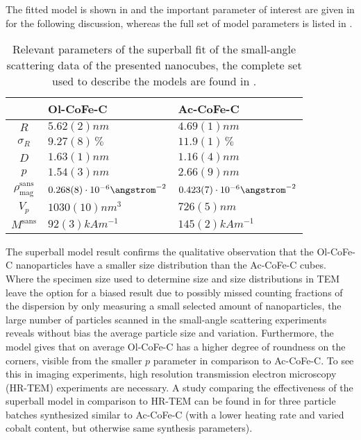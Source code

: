 The fitted model is shown in  and the important parameter of interest are given in  for the following discussion, whereas the full set of model parameters is listed in .
\begin{table}[ht]
  \centering
  \caption{\label{tab:monolayers:nanoparticle:sas}Relevant parameters of the superball fit of the small-angle scattering data of the presented nanocubes, the complete set used to describe the models are found in .}
  \begin{tabular}{ c | l | l }
      & Ol-CoFe-C & Ac-CoFe-C \\
    \hline
    $R$
      & $5.62(2) \unit{nm}$
      & $4.69(1) \unit{nm}$\\
    $\sigma_R$
      & $9.27(8) \,\%$
      & $11.9(1) \,\%$\\
    $D$
      & $1.63(1) \unit{nm}$
      & $1.16(4) \unit{nm}$\\
    $p$
      & $1.54(3) \unit{nm}$
      & $2.66(9) \unit{nm}$\\
    $\rho_\mathrm{mag}^\mathrm{sans}$
      & $0.268(8) \cdot 10^{-6} \angstrom^{-2}$
      & $0.423(7) \cdot 10^{-6} \angstrom^{-2}$\\
    \hline
    $V_p$
      & $1030(10) \unit{nm^3}$
      & $726(5) \unit{nm}$\\
    $M^\mathrm{sans}$
      & $92(3) \unit{kAm^{-1}}$
      & $145(2) \unit{kAm^{-1}}$\\
    \hline
  \end{tabular}
\end{table}
The superball model result confirms the qualitative observation that the Ol-CoFe-C nanoparticles have a smaller size distribution than the Ac-CoFe-C cubes.
Where the specimen size used to determine size and size distributions in TEM leave the option for a biased result due to possibly missed counting fractions of the dispersion by only measuring a small selected amount of nanoparticles, the large number of particles scanned in the small-angle scattering experiments reveals without bias the average particle size and variation.
Furthermore, the model gives that on average Ol-CoFe-C has a higher degree of roundness on the corners, visible from the smaller $p$ parameter in comparison to Ac-CoFe-C.
To see this in imaging experiments, high resolution transmission electron microscopy (HR-TEM) experiments are necessary.
A study comparing the effectiveness of the superball model in comparison to HR-TEM can be found in  for three particle batches synthesized similar to Ac-CoFe-C (with a lower heating rate and varied cobalt content, but otherwise same synthesis parameters).

